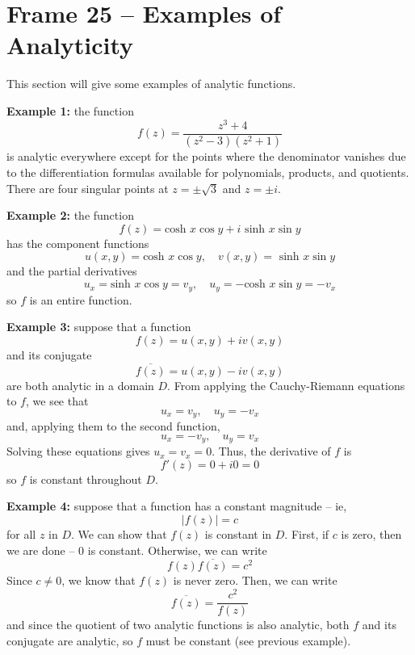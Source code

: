 \documentclass{article}
\renewcommand{\emph}{\textbf}
\renewcommand{\bar}{\overline}
\begin{document}
\clearpage
\section{Frame 25 -- Examples of Analyticity}
This section will give some examples of analytic functions.

\emph{Example 1:} the function
\[
	f(z) = \frac{z^3 + 4}{(z^2 - 3)(z^2 + 1)}
\]
is analytic everywhere except for the points where the denominator vanishes due to the differentiation formulas available for polynomials, products, and quotients. There are four singular points at $z = \pm \sqrt{3}$ and $z = \pm i$.

\emph{Example 2:} the function
\[
	f(z) = \text{cosh } x \cos y + i \text{ sinh } x \sin y
\]
has the component functions
\[
	u(x, y) = \text{cosh } x \cos y,	\quad	v(x, y) = \text{ sinh } x \sin y
\]
and the partial derivatives
\[
	u_x = \text{sinh } x \cos y = v_y,	\quad
	u_y = -\text{cosh } x \sin y = -v_x	
\]
so $f$ is an entire function.

\emph{Example 3:} suppose that a function
\[
	f(z) = u(x, y) + iv(x, y)
\]
and its conjugate
\[
	\bar{f(z)} = u(x, y) - iv(x, y)
\]
are both analytic in a domain $D$. From applying the Cauchy-Riemann equations to $f$, we see that
\[
	u_x = v_y,	\quad u_y = -v_x
\]
and, applying them to the second function,
\[
	u_x = -v_y,	\quad u_y = v_x
\]
Solving these equations gives $u_x = v_x = 0$. Thus, the derivative of $f$ is
\[
	f'(z) = 0 + i0 = 0
\]
so $f$ is constant throughout $D$.

\emph{Example 4:} suppose that a function has a constant magnitude -- ie,
\[
	|f(z)| = c
\]
for all $z$ in $D$. We can show that $f(z)$ is constant in $D$. First, if $c$ is zero, then we are done -- $0$ is constant. Otherwise, we can write
\[
	f(z) \bar{f(z)} = c^2
\]
Since $c \neq 0$, we know that $f(z)$ is never zero. Then, we can write
\[
	\bar{f(z)} = \frac{c^2}{f(z)}
\]
and since the quotient of two analytic functions is also analytic, both $f$ and its conjugate are analytic, so $f$ must be constant (see previous example).
\end{document}

